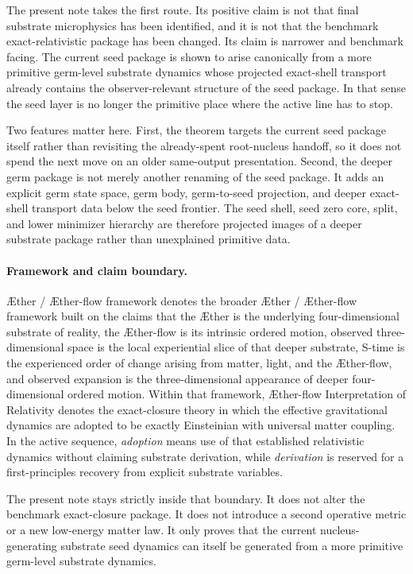 \documentclass[11pt]{article}
\newcommand{\Aether}{\AE{}ther}
\newcommand{\Aflow}{\AE{}ther-flow}
\newcommand{\TheoryName}{\Aflow{} Interpretation of Relativity}
\newcommand{\TheoryProgram}{\Aether{} / \Aflow{} framework}
\begin{document}
The present note takes the first route. Its positive claim is not that final substrate microphysics has been identified, and it is not that the benchmark exact-relativistic package has been changed. Its claim is narrower and benchmark facing. The current seed package is shown to arise canonically from a more primitive germ-level substrate dynamics whose projected exact-shell transport already contains the observer-relevant structure of the seed package. In that sense the seed layer is no longer the primitive place where the active line has to stop.

Two features matter here. First, the theorem targets the current seed package itself rather than revisiting the already-spent root-nucleus handoff, so it does not spend the next move on an older same-output presentation. Second, the deeper germ package is not merely another renaming of the seed package. It adds an explicit germ state space, germ body, germ-to-seed projection, and deeper exact-shell transport data below the seed frontier. The seed shell, seed zero core, split, and lower minimizer hierarchy are therefore projected images of a deeper substrate package rather than unexplained primitive data.

\paragraph{Framework and claim boundary.}
\TheoryProgram{} denotes the broader \Aether{} / \Aflow{} framework built on the claims that the \Aether{} is the underlying four-dimensional substrate of reality, the \Aflow{} is its intrinsic ordered motion, observed three-dimensional space is the local experiential slice of that deeper substrate, S-time is the experienced order of change arising from matter, light, and the \Aflow{}, and observed expansion is the three-dimensional appearance of deeper four-dimensional ordered motion. Within that framework, \TheoryName{} denotes the exact-closure theory in which the effective gravitational dynamics are adopted to be exactly Einsteinian with universal matter coupling. In the active sequence, \emph{adoption} means use of that established relativistic dynamics without claiming substrate derivation, while \emph{derivation} is reserved for a first-principles recovery from explicit substrate variables.

The present note stays strictly inside that boundary. It does not alter the benchmark exact-closure package. It does not introduce a second operative metric or a new low-energy matter law. It only proves that the current nucleus-generating substrate seed dynamics can itself be generated from a more primitive germ-level substrate dynamics.
\end{document}
